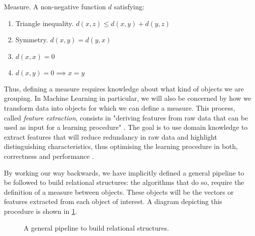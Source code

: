 \documentclass[../main.tex]{subfiles}
\begin{document}
\theoremstyle{definition}
\begin{definition}{Measure}.
A non-negative function $d$ satisfying:
\begin{enumerate}
\item Triangle inequality. $d(x, z) \leq d(x, y) + d(y, z) $
\item Symmetry. $d(x, y) = d(y, x)$
\item $d(x, x) = 0$
\item $d(x, y) = 0 \implies x = y$
\end{enumerate}
\end{definition}
\par Thus, defining a measure requires knowledge about what kind of objects we are grouping. In Machine Learning in particular, we will also be concerned by how we transform data into objects for which we can define a measure. This process, called \emph{feature extraction}, consists in "deriving features from raw data that can be used as input for a learning procedure" \cite{hastie2008}. The goal is to use domain knowledge to extract features that will reduce redundancy in raw data and highlight distinguishing characteristics, thus optimising the learning procedure in both, correctness and performance \cite{Bishop2006}. 
\par By working our way backwards, we have implicitly defined a general pipeline to be followed to build relational structures: the algorithms that do so, require the definition of a measure between objects. These objects will be the vectors or features extracted from each object of interest. A diagram depicting this procedure is shown in \ref{pipeline}.
\begin{figure}
\centering
{}
\caption{A general pipeline to build relational structures.}
\label{pipeline}
\end{figure}
\end{document}
